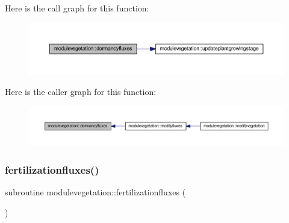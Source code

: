 Here is the call graph for this function\+:\nopagebreak
\begin{figure}[H]
\begin{center}
\leavevmode
\includegraphics[width=350pt]{namespacemodulevegetation_a62a594d5a2ef5f37a2dcbc4db8507793_cgraph}
\end{center}
\end{figure}
Here is the caller graph for this function\+:\nopagebreak
\begin{figure}[H]
\begin{center}
\leavevmode
\includegraphics[width=350pt]{namespacemodulevegetation_a62a594d5a2ef5f37a2dcbc4db8507793_icgraph}
\end{center}
\end{figure}
\mbox{\label{namespacemodulevegetation_a045ff1bdd58f618fc041e85a712080d6}} 
\subsubsection{\texorpdfstring{fertilizationfluxes()}{fertilizationfluxes()}}
{\footnotesize\ttfamily subroutine modulevegetation\+::fertilizationfluxes (\begin{DoxyParamCaption}{ }\end{DoxyParamCaption})\hspace{0.3cm}{\ttfamily [private]}}

